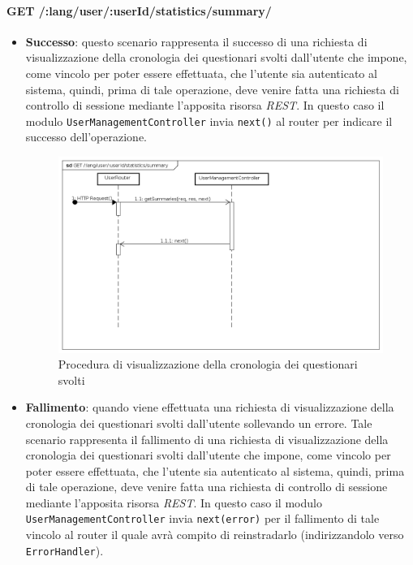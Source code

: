 \paragraph{GET /:lang/user/:userId/statistics/summary/}
\begin{itemize}
\item \textbf{Successo}: questo scenario rappresenta il successo di una richiesta di visualizzazione della cronologia dei questionari svolti dall'utente che impone, come vincolo per poter essere effettuata, che l'utente sia autenticato al sistema, quindi, prima di tale operazione, deve venire fatta una richiesta di controllo di sessione mediante l'apposita risorsa \textit{REST}.  
In questo caso il modulo \texttt{UserManagementController} invia \texttt{next()} al router per indicare il successo dell'operazione.
\label{Procedura di visualizzazione della cronologia dei questionari svolti}
\begin{figure}[ht]
	\centering
	\includegraphics[scale=0.40]{UML/DiagrammiDiSequenza/Back-end/GET_LangUserUserIdStatisticsSummarySuccess.png}
	\caption{Procedura di visualizzazione della cronologia dei questionari svolti}
\end{figure}
\FloatBarrier
\item \textbf{Fallimento}: quando viene effettuata una richiesta di visualizzazione della cronologia dei questionari svolti dall'utente sollevando un errore. Tale scenario rappresenta il fallimento di una richiesta di visualizzazione della cronologia dei questionari svolti dall'utente che impone, come vincolo per poter essere effettuata, che l'utente sia autenticato al sistema, quindi, prima di tale operazione, deve venire fatta una richiesta di controllo di sessione mediante l'apposita risorsa \textit{REST}. In questo caso il modulo \texttt{UserManagementController} invia \texttt{next(error)} per il fallimento di tale vincolo al router il quale avrà compito di reinstradarlo (indirizzandolo verso \texttt{ErrorHandler}).

\end{itemize}
